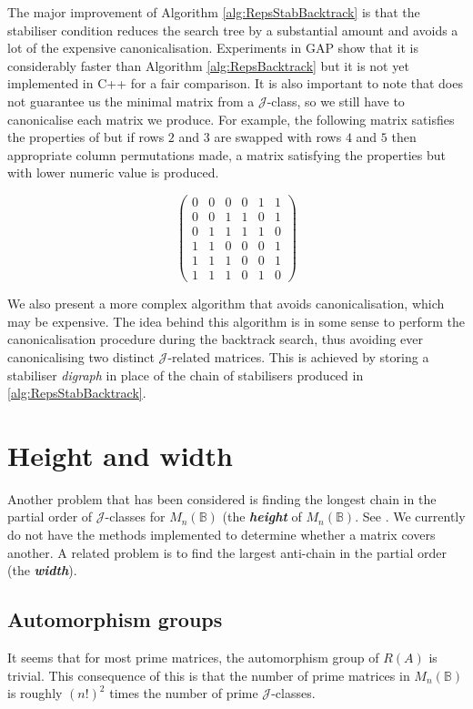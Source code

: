 \documentclass[11pt]{article}
\newcommand{\defn}[1]{\textbf{\textit{#1}}}
\numberwithin{equation}{section}
\newcommand{\B}{\mathbb{B}}
\newcommand{\Bn}{M_n(\B)}
\newcommand{\J}{\mathscr{J}}
\begin{document}
The major improvement of Algorithm \ref{alg:RepsStabBacktrack} is that the stabiliser condition reduces the search tree by a substantial amount and avoids a lot of the expensive canonicalisation.
Experiments in GAP show that it is considerably faster than Algorithm \ref{alg:RepsBacktrack} but it is not yet implemented in C++ for a fair comparison.
It is also important to note that  does not guarantee us the minimal matrix from a $\J$-class, so we still have to canonicalise each matrix we produce. For example, the following matrix satisfies the properties of  but if rows $2$ and $3$ are swapped with rows $4$ and $5$ then appropriate column permutations made, a matrix satisfying the properties but with lower numeric value is produced.

\[ 
  \begin{pmatrix}
    0 & 0 & 0 & 0 & 1 & 1 \\
    0 & 0 & 1 & 1 & 0 & 1 \\
    0 & 1 & 1 & 1 & 1 & 0 \\
    1 & 1 & 0 & 0 & 0 & 1 \\
    1 & 1 & 1 & 0 & 0 & 1 \\
    1 & 1 & 1 & 0 & 1 & 0
  \end{pmatrix}
\]

We also present a more complex algorithm that avoids canonicalisation, which may
be expensive. The idea behind this algorithm is in some sense to perform the
canonicalisation procedure during the backtrack search, thus avoiding ever
canonicalising two distinct $\J$-related matrices. This is achieved by storing
a stabiliser \emph{digraph} in place of the chain of stabilisers produced in
\ref{alg:RepsStabBacktrack}.

\section{Height and width}
Another problem that has been considered is finding the longest chain in the
partial order of $\J$-classes for $\Bn$ (the \defn{height} of $\Bn$. 
See \cite{Breen2001}. We currently do not have the methods implemented to determine whether a matrix covers another.
A related problem is to find the largest anti-chain in the partial order
(the \defn{width}).




\subsection*{Automorphism groups}
It seems that for most prime matrices, the automorphism group of $R(A)$ is trivial. This consequence of this is that the number of prime matrices in $\Bn$ is roughly $(n!)^2$ times the number of prime $\J$-classes.

\printbibliography
\end{document}
